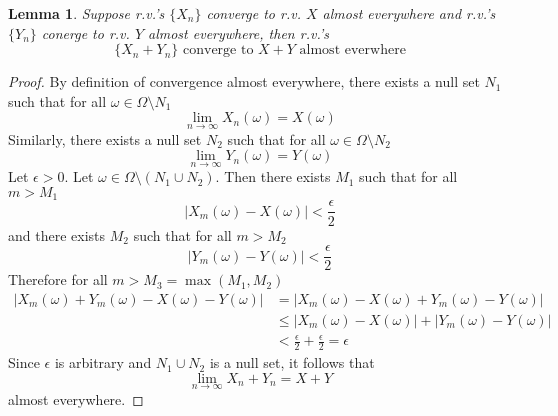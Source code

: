 \documentclass[letterpaper, 12pt]{article}
\newtheorem{lem}{Lemma}
\begin{document}
\begin{lem}
Suppose r.v.'s $\{X_n\}$ converge to r.v. $X$ almost everywhere and r.v.'s $\{Y_n\}$ conerge to r.v. $Y$ almost everywhere, then r.v.'s
\[
\{X_n + Y_n\} \text{ converge to } X+Y \text{ almost everwhere}
\]
\end{lem}
\begin{proof}
By definition of convergence almost everywhere, there exists a null set $N_1$ such that for all $\omega \in \Omega \setminus N_1$
\[
\lim_{n\to\infty} X_n(\omega) = X(\omega)
\]
Similarly, there exists a null set $N_2$ such that for all 
$\omega \in \Omega \setminus N_2$
\[
\lim_{n\to\infty} Y_n(\omega) = Y(\omega)
\]
Let $\epsilon > 0$.
Let $\omega \in \Omega \setminus (N_1 \cup N_2)$. Then there exists $M_1$ such that for all $m > M_1$
\[
|X_m(\omega) - X(\omega)| < \frac{\epsilon}{2}
\]
and there exists $M_2$ such that for all $m > M_2$
\[
|Y_m(\omega) - Y(\omega)| < \frac{\epsilon}{2}
\]
Therefore for all $m > M_3 = \max(M_1, M_2)$
\begin{align*}
|X_m(\omega) + Y_m(\omega) - X(\omega) - Y(\omega)|
&=
|X_m(\omega)- X(\omega) + Y_m(\omega) - Y(\omega)|
\\
&\leq
|X_m(\omega)- X(\omega)| + |Y_m(\omega) - Y(\omega)|
\\
&<
\frac{\epsilon}{2} + \frac{\epsilon}{2} = \epsilon
\end{align*}
Since $\epsilon$ is arbitrary and $N_1 \cup N_2$ is a null set, it follows that
\[
\lim_{n \to \infty} X_n + Y_n = X+Y
\] 
almost everywhere.
\end{proof}
\end{document}
